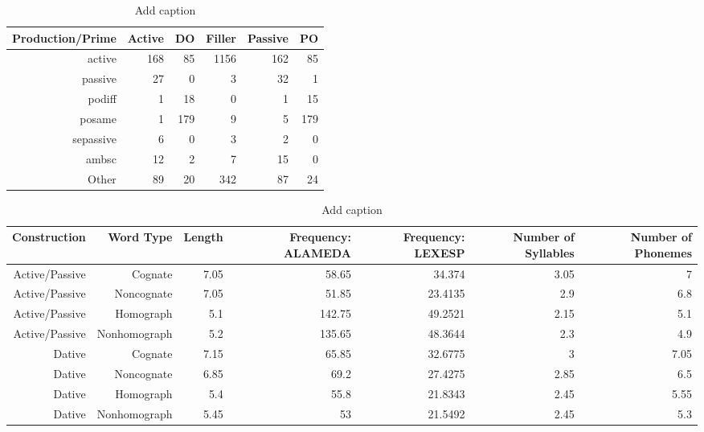 \begin{table}[htbp]
  \centering
  \caption{Add caption}
    \begin{tabular}{rrrrrr}
    \toprule
    Production/Prime & Active & DO    & Filler & Passive & PO \\
    \midrule
    active & 168   & 85    & 1156  & 162   & 85 \\
    passive & 27    & 0     & 3     & 32    & 1 \\
    podiff & 1     & 18    & 0     & 1     & 15 \\
    posame & 1     & 179   & 9     & 5     & 179 \\
    sepassive & 6     & 0     & 3     & 2     & 0 \\
    ambsc & 12    & 2     & 7     & 15    & 0 \\
    Other & 89    & 20    & 342   & 87    & 24 \\
    \bottomrule
    \end{tabular}%
  \label{tab:addlabel}%
\end{table}%
\begin{table}[htbp]
  \centering
  \caption{Add caption}
    \begin{tabular}{rrrrrrr}
    \toprule
    Construction & Word Type & Length & Frequency: ALAMEDA & Frequency: LEXESP & Number of Syllables & Number of Phonemes \\
    \midrule
    Active/Passive & Cognate & 7.05  & 58.65 & 34.374 & 3.05  & 7 \\
    Active/Passive & Noncognate & 7.05  & 51.85 & 23.4135 & 2.9   & 6.8 \\
    Active/Passive & Homograph & 5.1   & 142.75 & 49.2521 & 2.15  & 5.1 \\
    Active/Passive & Nonhomograph & 5.2   & 135.65 & 48.3644 & 2.3   & 4.9 \\
    Dative & Cognate & 7.15  & 65.85 & 32.6775 & 3     & 7.05 \\
    Dative & Noncognate & 6.85  & 69.2  & 27.4275 & 2.85  & 6.5 \\
    Dative & Homograph & 5.4   & 55.8  & 21.8343 & 2.45  & 5.55 \\
    Dative & Nonhomograph & 5.45  & 53    & 21.5492 & 2.45  & 5.3 \\
    \bottomrule
    \end{tabular}%
  \label{tab:addlabel}%
\end{table}%
